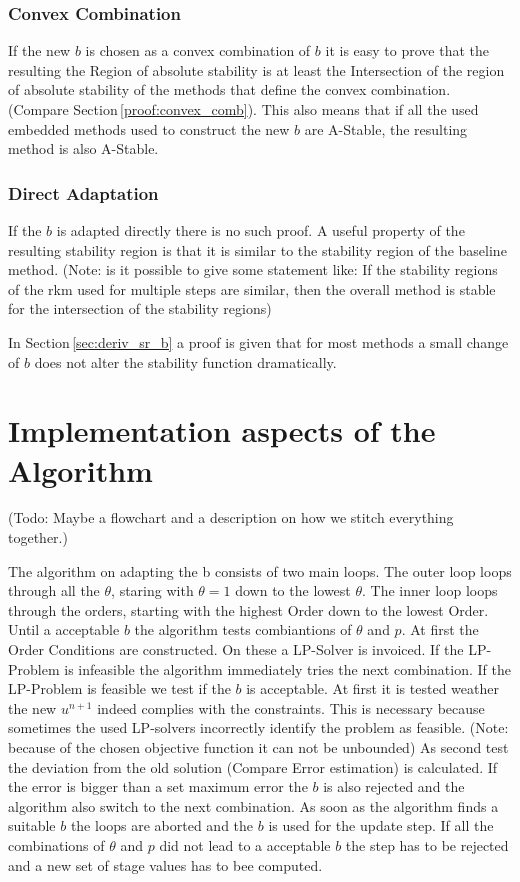 \documentclass{article}
\begin{document}
\subsubsection{Convex Combination}
If the new $b$ is chosen as a convex combination of $b$ it is easy to prove that the resulting  the Region of absolute stability is at least the Intersection of the region of absolute stability of the methods that define the convex combination. (Compare Section\,\ref{proof:convex_comb}). This also means that if all the used embedded methods used to construct the new $b$ are A-Stable, the resulting method is also A-Stable.


\subsubsection{Direct Adaptation}
If the $b$ is adapted directly there is no such proof.
A useful property of the resulting stability region is that it is similar to the stability region of the baseline method. 
(Note: is it possible to give some statement like: If the stability regions of the rkm used for multiple steps are similar, then the overall method is stable for the intersection of the stability regions)

In Section\,\ref{sec:deriv_sr_b} a proof is given that for most methods a small change of $b$ does not alter the stability function dramatically.






\section{Implementation aspects of the Algorithm}

(Todo: Maybe a flowchart and a description on how we stitch everything together.) 

The algorithm on adapting the b consists of two main loops. The outer loop loops through all the $\theta$, staring with $\theta = 1$ down to the lowest $\theta$. The inner loop loops through the orders, starting with the highest Order down to the lowest Order. 
Until a acceptable $b$ the algorithm tests combiantions of $\theta$ and $p$. At first the Order Conditions are constructed. On these a LP-Solver is invoiced. If the LP-Problem is infeasible the algorithm immediately tries the next combination. If the LP-Problem is feasible we test if the $b$ is acceptable. At first it is tested weather the new $u^{n+1}$ indeed complies with the constraints. This is necessary because sometimes the used LP-solvers incorrectly identify the problem as feasible. (Note: because of the chosen objective function it can not be unbounded) As second test the deviation from the old solution (Compare Error estimation) is calculated. If the error is bigger than a set maximum error the $b$ is also rejected and the algorithm also switch to the next combination.
As soon as the algorithm finds a suitable $b$ the loops are aborted and the $b$ is used for the update step.
If all the combinations of $\theta$ and $p$ did not lead to a acceptable $b$ the step has to be rejected and a new set of stage values has to bee computed.
\end{document}
